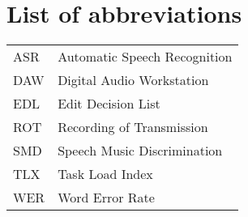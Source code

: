 \chapter*{List of abbreviations}

\begin{tabular}{l l}
ASR & Automatic Speech Recognition \\
DAW & Digital Audio Workstation \\
EDL & Edit Decision List \\
ROT & Recording of Transmission \\
SMD & Speech Music Discrimination \\
TLX & Task Load Index \\
WER & Word Error Rate
\end{tabular}
